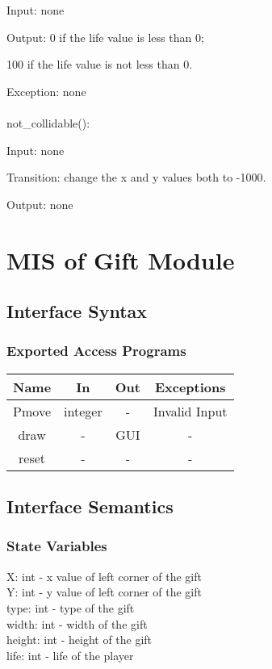 \documentclass[12,english]{article}
\begin{document}
		Input: none
	
		Output: 0 if the life value is less than 0;
		
		        100 if the life value is not less than 0.
			 
		Exception: none\\
		\\
		not\_collidable():
		
		Input: none
		
		Transition: change the x and y values both to -1000.
	   
	    Output: none

	
\section{MIS of Gift Module}
		\subsection{Interface Syntax}
			\subsubsection{Exported Access Programs}
				\begin{tabular}[pos]{|c|c|c|c|}
					
					\hline
					\textbf{Name}& \textbf{In} & \textbf{Out} & \textbf{Exceptions} \\ \hline
					Pmove & integer & - & Invalid Input\\ \hline
					draw & - & GUI & -\\ \hline
					reset & - & - & -\\ \hline
					
				\end{tabular}
				
		\subsection{Interface Semantics}
			\subsubsection{State Variables}
			X: int - x value of left corner of the gift\\
			Y: int - y value of left corner of the gift\\
			type: int - type of the gift\\
			width: int - width of the gift\\
			height: int - height of the gift\\
			life: int - life of the player
			
\end{document}
